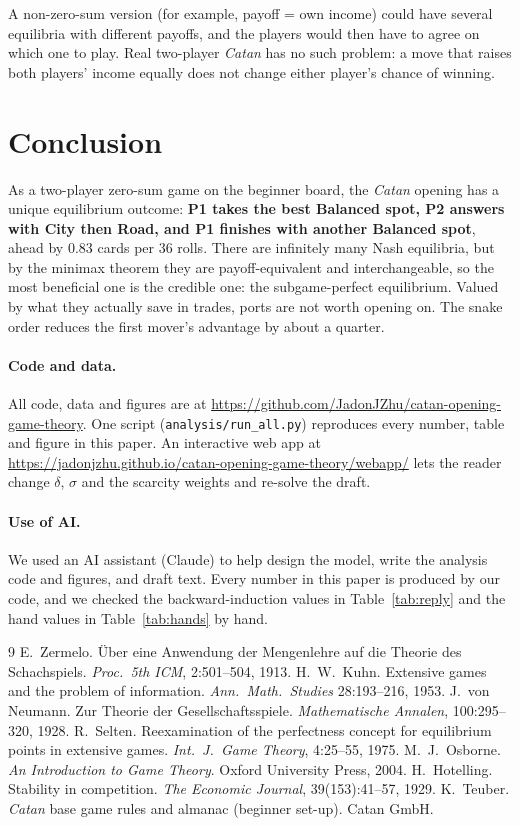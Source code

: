 \documentclass[11pt]{article}
\begin{document}
A non-zero-sum version (for example, payoff = own income) could have several equilibria with different payoffs, and the players would then have to agree on which one to play. Real two-player \emph{Catan} has no such problem: a move that raises both players' income equally does not change either player's chance of winning.

\section{Conclusion}
As a two-player zero-sum game on the beginner board, the \emph{Catan} opening has a unique equilibrium outcome: \textbf{P1 takes the best Balanced spot, P2 answers with City then Road, and P1 finishes with another Balanced spot}, ahead by $0.83$ cards per 36 rolls. There are infinitely many Nash equilibria, but by the minimax theorem they are payoff-equivalent and interchangeable, so the most beneficial one is the credible one: the subgame-perfect equilibrium. Valued by what they actually save in trades, ports are not worth opening on. The snake order reduces the first mover's advantage by about a quarter.

\paragraph{Code and data.} All code, data and figures are at \url{https://github.com/JadonJZhu/catan-opening-game-theory}. One script (\texttt{analysis/run\_all.py}) reproduces every number, table and figure in this paper. An interactive web app at \url{https://jadonjzhu.github.io/catan-opening-game-theory/webapp/} lets the reader change $\delta$, $\sigma$ and the scarcity weights and re-solve the draft.

\paragraph{Use of AI.}
We used an AI assistant (Claude) to help design the model, write the analysis code and figures, and draft text. Every number in this paper is produced by our code, and we checked the backward-induction values in Table~\ref{tab:reply} and the hand values in Table~\ref{tab:hands} by hand.

\begin{thebibliography}{9}\footnotesize\setlength{\itemsep}{0pt}
 E.~Zermelo. \"Uber eine Anwendung der Mengenlehre auf die Theorie des Schachspiels. \emph{Proc.\ 5th ICM}, 2:501--504, 1913.
 H.~W.~Kuhn. Extensive games and the problem of information. \emph{Ann.\ Math.\ Studies} 28:193--216, 1953.
 J.~von Neumann. Zur Theorie der Gesellschaftsspiele. \emph{Mathematische Annalen}, 100:295--320, 1928.
 R.~Selten. Reexamination of the perfectness concept for equilibrium points in extensive games. \emph{Int.\ J.\ Game Theory}, 4:25--55, 1975.
 M.~J.~Osborne. \emph{An Introduction to Game Theory}. Oxford University Press, 2004.
 H.~Hotelling. Stability in competition. \emph{The Economic Journal}, 39(153):41--57, 1929.
 K.~Teuber. \emph{Catan} base game rules and almanac (beginner set-up). Catan GmbH.
\end{thebibliography}
\appendix
\end{document}

